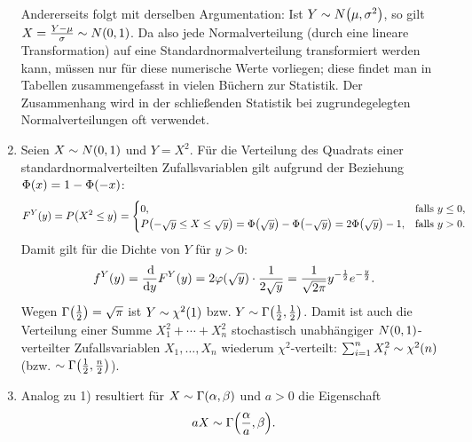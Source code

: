 \documentclass{lecture}
\begin{document}
\begin{example}
\begin{enumerate}
            Andererseits folgt mit derselben Argumentation: Ist \(Y \sim N\parentheses*{\mu, \sigma^2}\), so gilt \(X = \frac{Y - \mu}{\sigma} \sim N\parentheses*{0, 1}\).
            Da also jede Normalverteilung (durch eine lineare Transformation) auf eine Standardnormalverteilung transformiert werden kann, müssen nur für diese numerische Werte vorliegen; diese findet man in Tabellen zusammengefasst in vielen Büchern zur Statistik.
            Der Zusammenhang wird in der schließenden Statistik bei zugrundegelegten Normalverteilungen oft verwendet.
            \item Seien \(X \sim N\parentheses*{0, 1}\) und \(Y = X^2\).
            Für die Verteilung des Quadrats einer standardnormalverteilten Zufallsvariablen gilt aufgrund der Beziehung \(\Phi\parentheses*{x} = 1 - \Phi\parentheses*{-x}\):
            \[
                F^Y\parentheses*{y} = P\parentheses*{X^2 \le y} = \begin{cases}
                    0, & \text{falls }y \le 0,\\
                    P\parentheses*{-\sqrt{y} \le X \le \sqrt{y}} = \Phi\parentheses*{\sqrt{y}} - \Phi\parentheses*{-\sqrt{y}} = 2\Phi\parentheses*{\sqrt{y}} - 1, & \text{falls }y > 0.
                \end{cases}
            \]
            Damit gilt für die Dichte von \(Y\) für \(y > 0\):
            \[
                f^Y\parentheses*{y} = \frac{\d}{\d y}F^Y\parentheses*{y} = 2\varphi\parentheses*{\sqrt{y}} \cdot \frac{1}{2\sqrt{y}} = \frac{1}{\sqrt{2\pi}}y^{-\frac{1}{2}}e^{-\frac{y}{2}}.
            \]
            Wegen \(\Gamma\parentheses*{\frac{1}{2}} = \sqrt{\pi}\) ist \(Y \sim \chi^2\parentheses*{1}\) bzw. \(Y \sim \Gamma\parentheses*{\frac{1}{2}, \frac{1}{2}}\).
            Damit ist auch die Verteilung einer Summe \(X_1^2 + \cdots + X_n^2\) stochastisch unabhängiger \(N\parentheses*{0, 1}\)-verteilter Zufallsvariablen \(X_1, \ldots, X_n\) wiederum \(\chi^2\)-verteilt: \(\sum_{i = 1}^n X_i^2 \sim \chi^2\parentheses*{n}\) (bzw. \(\sim \Gamma\parentheses*{\frac{1}{2}, \frac{n}{2}}\)).
            \item Analog zu 1) resultiert für \(X \sim \Gamma\parentheses*{\alpha, \beta}\) und \(a > 0\) die Eigenschaft
            \[
                aX \sim \Gamma\parentheses*{\frac{\alpha}{a}, \beta}.
            \] 
        \end{enumerate}
    \end{example}
\end{document}
